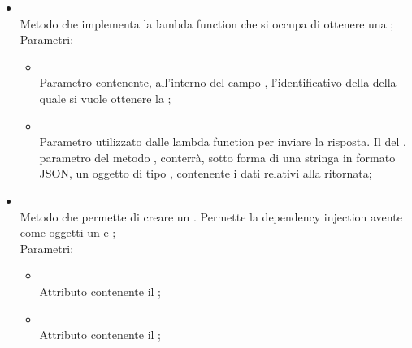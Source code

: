 \begin{itemize}
\begin{itemize}
\begin{itemize}
		\end{itemize}
		\item[]  \\
		Metodo che implementa la lambda function che si occupa di ottenere una ;\\
		Parametri:
		\begin{itemize}
			\item {} \\
			Parametro contenente, all'interno del campo , l'identificativo della  della quale si vuole ottenere la ;
			\item {} \\
			Parametro utilizzato dalle lambda function per inviare la risposta. Il  del , parametro del metodo , conterrà, sotto forma di una stringa in formato JSON, un oggetto di tipo , contenente i dati relativi alla  ritornata;
		\end{itemize}
		\item[]  \\
		Metodo che permette di creare un . Permette la dependency injection avente come oggetti un  e ;\\
		Parametri:
		\begin{itemize}
			\item {} \\
			Attributo contenente il ;
			\item {} \\
			Attributo contenente il ;
		\end{itemize}
	\end{itemize}
\end{itemize}

